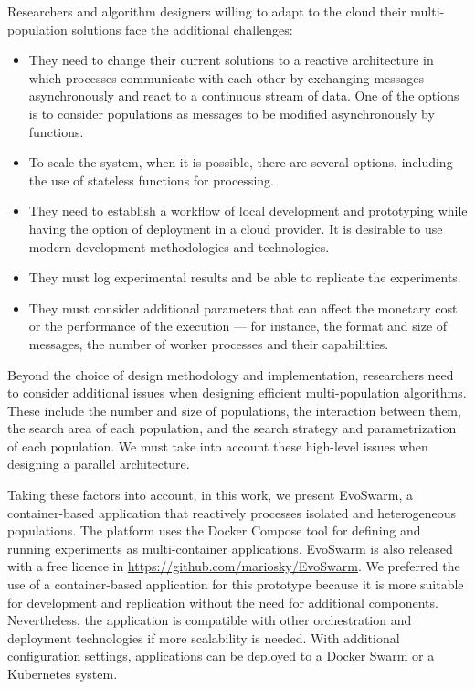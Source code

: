 \documentclass[review]{elsarticle}
\begin{document}
Researchers 
and algorithm designers willing to  adapt to the cloud their
multi-population solutions face the additional challenges:
\begin{itemize}
    \item They need to change their current solutions to a reactive architecture in which processes
    communicate with each other by exchanging messages asynchronously and react
    to a continuous stream of data. One of the options is to consider
    populations as messages to be modified asynchronously by functions. 

    \item To scale the system, when it is possible, there are several options, including the  use of stateless functions for
    processing. 

    \item They need to establish a workflow of local development and prototyping while having the 
    option of deployment in a cloud provider. It is desirable to use modern development methodologies and technologies. 

    \item They must log experimental results and be able to replicate the experiments. 

    \item They must consider additional parameters that can affect the monetary cost or the performance of the
    execution — for instance, the format and size of messages, the number of
    worker processes and their capabilities.  
\end{itemize}

Beyond the choice of design methodology and implementation, researchers need to
consider additional issues \cite{Ma2019} when designing efficient multi-population algorithms. These include the number and size of populations,
the interaction between them, the search area of each population, and the search
strategy and parametrization of each population. We must take into account
these high-level issues when designing a parallel architecture.

Taking these factors into account, in this work, we present EvoSwarm, 
a container-based application that reactively processes
isolated and
heterogeneous populations. The platform uses the Docker Compose tool for
defining and running experiments as multi-container applications. EvoSwarm is also released with a free licence in \url{https://github.com/mariosky/EvoSwarm}.
We preferred the use of a container-based application for this prototype because
it is more suitable for development and replication without the need for
additional components. Nevertheless, the application is compatible with other
orchestration and deployment technologies if more scalability is needed. 
With additional configuration settings, applications can be deployed 
to a Docker Swarm or a Kubernetes system.  
\end{document}

